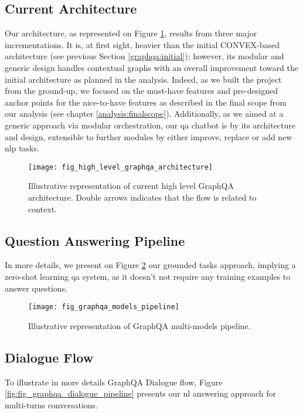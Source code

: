 \subsection{Current Architecture}
Our architecture, as represented on Figure \ref{fig:fig_high_level_graphqa_architecture}, results from three major incrementations. It is, at first sight, heavier than the initial CONVEX-based architecture (see previous Section \ref{graphqa:initial}); however, its modular and generic design handles contextual graphs with an overall improvement toward the initial architecture as planned in the analysis. Indeed, as we built the project from the ground-up, we focused on the must-have features and pre-designed anchor points for the nice-to-have features as described in the final scope from our analysis (see chapter \ref{analysis:finalscope}). Additionally, as we aimed at a generic approach via modular orchestration, our \gls{qa} chatbot is by its architecture and design, extensible to further modules by either improve, replace or add new \gls{nlp} tasks.


\begin{figure}
    \centering
    \texttt{[image: fig\_high\_level\_graphqa\_architecture]}
    \caption{Illustrative representation of current high level GraphQA architecture. Double arrows indicates that the flow is related to context.}
    \label{fig:fig_high_level_graphqa_architecture}
\end{figure}

\subsection{Question Answering Pipeline}
In more details, we present on Figure \ref{fig:fig_graphqa_models_pipeline} our grounded tasks approach, implying a \gls{zero-shot} learning \gls{qa} system, as it doesn't not require any training examples to answer questions.

\begin{figure}
    \centering
    \texttt{[image: fig\_graphqa\_models\_pipeline]}
    \caption{Illustrative representation of GraphQA multi-models pipeline.}
    \label{fig:fig_graphqa_models_pipeline}
\end{figure}

\subsection{Dialogue Flow}
To illustrate in more details GraphQA Dialogue flow, Figure \ref{fig:fig_graphqa_dialogue_pipeline} presents our \gls{nl} answering approach for multi-turns conversations.

